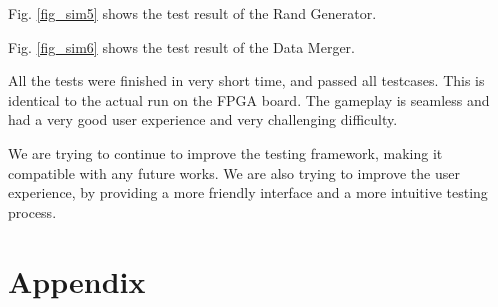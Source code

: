 \documentclass[conference]{IEEEtran}
\begin{document}
Fig. \ref{fig_sim5} shows the test result of the Rand Generator.

Fig. \ref{fig_sim6} shows the test result of the Data Merger.

All the tests were finished in very short time, and passed all testcases. This is identical to the actual run on the FPGA board. The gameplay is seamless and had a very good user experience and very challenging difficulty.

We are trying to continue to improve the testing framework, making it compatible with any future works. We are also trying to improve the user experience, by providing a more friendly interface and a more intuitive testing process. 

\pagebreak

\section{Appendix}


\end{document}
